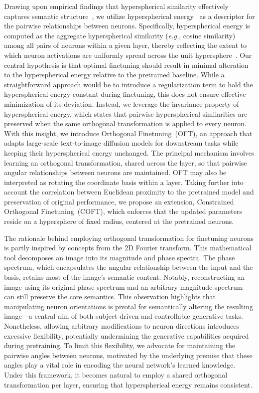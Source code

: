 Drawing upon empirical findings that hyperspherical similarity effectively captures semantic structure~\cite{liu2017deep,liu2018decoupled,chen2020angular}, we utilize hyperspherical energy~\cite{liu2018learning} as a descriptor for the pairwise relationships between neurons. Specifically, hyperspherical energy is computed as the aggregate hyperspherical similarity (\emph{e.g.}, cosine similarity) among all pairs of neurons within a given layer, thereby reflecting the extent to which neuron activations are uniformly spread across the unit hypersphere~\cite{liu2021learning}. Our central hypothesis is that optimal finetuning should result in minimal alteration to the hyperspherical energy relative to the pretrained baseline. While a straightforward approach would be to introduce a regularization term to hold the hyperspherical energy constant during finetuning, this does not ensure effective minimization of its deviation. Instead, we leverage the invariance property of hyperspherical energy, which states that pairwise hyperspherical similarities are preserved when the same orthogonal transformation is applied to every neuron. With this insight, we introduce Orthogonal Finetuning~(OFT), an approach that adapts large-scale text-to-image diffusion models for downstream tasks while keeping their hyperspherical energy unchanged. The principal mechanism involves learning an orthogonal transformation, shared across the layer, so that pairwise angular relationships between neurons are maintained. OFT may also be interpreted as rotating the coordinate basis within a layer. Taking further into account the correlation between Euclidean proximity to the pretrained model and preservation of original performance, we propose an extension, Constrained Orthogonal Finetuning~(COFT), which enforces that the updated parameters reside on a hypersphere of fixed radius, centered at the pretrained neurons.

The rationale behind employing orthogonal transformation for finetuning neurons is partly inspired by concepts from the 2D Fourier transform. This mathematical tool decomposes an image into its magnitude and phase spectra. The phase spectrum, which encapsulates the angular relationship between the input and the basis, retains most of the image's semantic content. Notably, reconstructing an image using its original phase spectrum and an arbitrary magnitude spectrum can still preserve the core semantics. This observation highlights that manipulating neuron orientations is pivotal for semantically altering the resulting image—a central aim of both subject-driven and controllable generative tasks. Nonetheless, allowing arbitrary modifications to neuron directions introduces excessive flexibility, potentially undermining the generative capabilities acquired during pretraining. To limit this flexibility, we advocate for maintaining the pairwise angles between neurons, motivated by the underlying premise that these angles play a vital role in encoding the neural network’s learned knowledge. Under this framework, it becomes natural to employ a shared orthogonal transformation per layer, ensuring that hyperspherical energy remains consistent.


